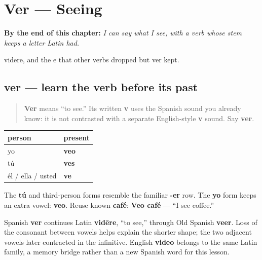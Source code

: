 
\chapter{Ver --- Seeing}
\label{ch:spanish-ver}

\begin{chapteropening}
\textbf{By the end of this chapter:} \emph{I can say what I see, with a verb whose stem keeps a letter Latin had.}

videre, and the e that other verbs dropped but ver kept.
\end{chapteropening}

\section[ver]{ver — learn the verb before its past}

\label{lesson:ES-C16-ver}



\begin{quote}
\textbf{Ver} means “to see.” Its written \textbf{v} uses the Spanish sound you already know: it is not contrasted with a separate English-style \textbf{v} sound. Say \textbf{ver}.
\end{quote}

\begin{grammarlens}[title={Grammar Lens: three present forms}]
\noindent
\begin{tabularx}{\linewidth}{@{}>{\raggedright\arraybackslash}X>{\raggedright\arraybackslash}X@{}}
\toprule
\textbf{person} & \textbf{present} \\
\midrule
yo & \textbf{veo} \\
tú & \textbf{ves} \\
él / ella / usted & \textbf{ve} \\
\bottomrule
\end{tabularx}

The \textbf{tú} and third-person forms resemble the familiar \textbf{-er} row. The \textbf{yo} form keeps an extra vowel: \textbf{veo}. Reuse known \textbf{café}: \textbf{Veo café} — “I see coffee.”
\end{grammarlens}

\begin{cousinweb}
Spanish \textbf{ver} continues Latin \textbf{vidēre}, “to see,” through Old Spanish \textbf{veer}. Loss of the consonant between vowels helps explain the shorter shape; the two adjacent vowels later contracted in the infinitive. English \textbf{video} belongs to the same Latin family, a memory bridge rather than a new Spanish word for this lesson.
\end{cousinweb}

